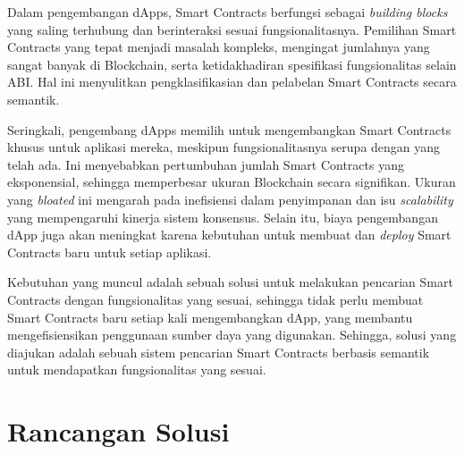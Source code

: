 
Dalam pengembangan dApps, Smart Contracts berfungsi sebagai \textit{building blocks} yang saling terhubung dan berinteraksi sesuai fungsionalitasnya. Pemilihan Smart Contracts yang tepat menjadi masalah kompleks, mengingat jumlahnya yang sangat banyak di Blockchain, serta ketidakhadiran spesifikasi fungsionalitas selain ABI. Hal ini menyulitkan pengklasifikasian dan pelabelan Smart Contracts secara semantik.

Seringkali, pengembang dApps memilih untuk mengembangkan Smart Contracts khusus untuk aplikasi mereka, meskipun fungsionalitasnya serupa dengan yang telah ada. Ini menyebabkan pertumbuhan jumlah Smart Contracts yang eksponensial, sehingga memperbesar ukuran Blockchain secara signifikan. Ukuran yang \textit{bloated} ini mengarah pada inefisiensi dalam penyimpanan dan isu \textit{scalability} yang mempengaruhi kinerja sistem konsensus. Selain itu, biaya pengembangan dApp juga akan meningkat karena kebutuhan untuk membuat dan \textit{deploy} Smart Contracts baru untuk setiap aplikasi.


Kebutuhan yang muncul adalah sebuah solusi untuk melakukan pencarian Smart Contracts dengan fungsionalitas yang sesuai, sehingga tidak perlu membuat Smart Contracts baru setiap kali mengembangkan dApp, yang membantu mengefisiensikan penggunaan sumber daya yang digunakan. Sehingga, solusi yang diajukan adalah sebuah sistem pencarian Smart Contracts berbasis semantik untuk mendapatkan fungsionalitas yang sesuai.


\section{Rancangan Solusi}




